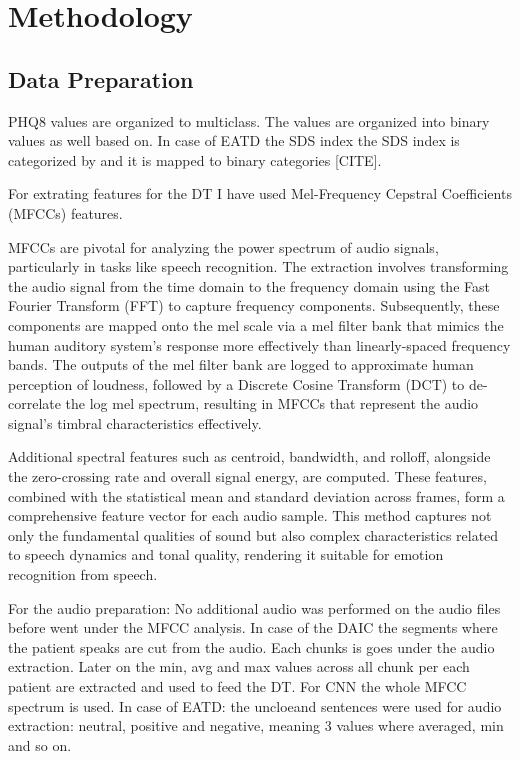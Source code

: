 \section{Methodology}

\subsection{Data Preparation}

PHQ8 values are organized to  multiclass\cite{kroenke2001phq}. The values are organized into binary values as well based on\cite{kroenke2009phq}. In case of EATD the SDS index the SDS index is categorized by and it is mapped to binary categories [CITE]. 

For extrating features for the DT I have used Mel-Frequency Cepstral Coefficients (MFCCs)\cite{tiwari2010mfcc} features. 

MFCCs are pivotal for analyzing the power spectrum of audio signals, particularly in tasks like speech recognition. The extraction involves transforming the audio signal from the time domain to the frequency domain using the Fast Fourier Transform (FFT) to capture frequency components. Subsequently, these components are mapped onto the mel scale via a mel filter bank that mimics the human auditory system's response more effectively than linearly-spaced frequency bands. The outputs of the mel filter bank are logged to approximate human perception of loudness, followed by a Discrete Cosine Transform (DCT) to de-correlate the log mel spectrum, resulting in MFCCs that represent the audio signal's timbral characteristics effectively.

Additional spectral features such as centroid, bandwidth, and rolloff, alongside the zero-crossing rate and overall signal energy, are computed. These features, combined with the statistical mean and standard deviation across frames, form a comprehensive feature vector for each audio sample. This method captures not only the fundamental qualities of sound but also complex characteristics related to speech dynamics and tonal quality, rendering it suitable for emotion recognition from speech.

For the audio preparation: No additional audio  was performed on the audio files before went under the MFCC analysis. In case of the DAIC the segments where the patient speaks are cut from the audio. Each chunks is goes under the audio extraction. Later on the min, avg and max values across all chunk per each patient are extracted and used to feed the DT. For CNN the whole MFCC spectrum is used. In case of EATD: the uncloeand sentences were used for audio extraction: neutral, positive and negative, meaning 3 values where averaged, min and so on. 


